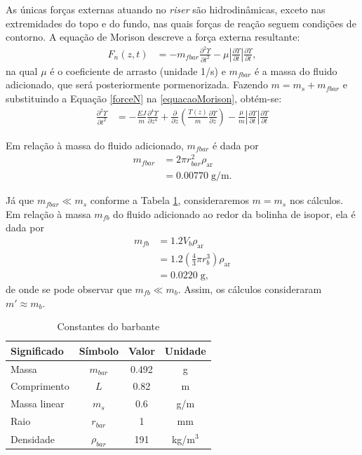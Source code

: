 As únicas forças externas atuando no \textit{riser} são hidrodinâmicas, exceto nas extremidades do topo e do fundo, nas quais forças de reação seguem condições de contorno. A equação de Morison descreve a força externa resultante: \begin{align}
	F_n(z,t) &= -m_{fbar} \frac{\partial^2 \Upsilon}{\partial t^2} - \mu \left|\frac{\partial \Upsilon}{\partial t}\right|\frac{\partial \Upsilon}{\partial t}\label{forceN},
\end{align} na qual $\mu$ é o coeficiente de arrasto (unidade 1/s) e $m_{fbar}$ é a massa do fluido adicionado, que será posteriormente pormenorizada. Fazendo $m = m_s + m_{fbar}$ e substituindo a Equação \ref{forceN} na \ref{equacaoMorison}, obtém-se: \begin{align}
	\frac{\partial^2 \Upsilon}{\partial t^2} &= -\frac{EJ}{m}\frac{\partial^4 \Upsilon}{\partial z^4} + \frac{\partial}{\partial z}\left(\frac{T(z)}{m}\frac{\partial \Upsilon}{\partial z}\right) - \frac{\mu}{m}\left|\frac{\partial \Upsilon}{\partial t}\right|\frac{\partial \Upsilon}{\partial t}
\end{align}

Em relação à massa do fluido adicionado, $m_{fbar}$ é dada por \begin{align}
	m_{fbar} &=  2 \pi r_{bar}^2 \rho_{\mathrm{ar}}\nonumber\\
	&= 0.00770\;\mathrm{g/m}.
\end{align} 

 Já que $m_{fbar} \ll m_s$ conforme a Tabela \ref{constanteBarbante}, consideraremos $m = m_s$ nos cálculos. Em relação à massa $m_{fb}$ do fluido adicionado ao redor da bolinha de isopor, ela é dada por\begin{align}
	m_{fb} &= 1.2 V_{b} \rho_{\mathrm{ar}}\nonumber\\
	&= 1.2 \left(\frac{4}{3}\pi r_b^3\right)\rho_{\mathrm{ar}}\nonumber\\
	&= 0.0220\;\textrm{g},
\end{align} de onde se pode observar que $m_{fb} \ll m_{b}$. Assim,  os cálculos consideraram $m' \approx m_b$.

\begin{table}[!ht]
	\centering
	\begin{tabular}{|l|c|c|c|}
		\hline
		\textbf{Significado} & \textbf{Símbolo} & \textbf{Valor} & \textbf{Unidade}\\ \hline \hline
		Massa & $m_{bar}$ & 0.492 & g\\ \hline
		Comprimento & $L$ & 0.82 & m \\ \hline
		Massa linear & $m_s$ & 0.6 & g/m\\ \hline
		Raio & $r_{bar}$ & 1 & mm\\ \hline
		Densidade & $\rho_{bar}$ & 191 & kg/m$^3$\\ \hline
	\end{tabular}
	\caption{Constantes do barbante\label{constanteBarbante}}
\end{table}

